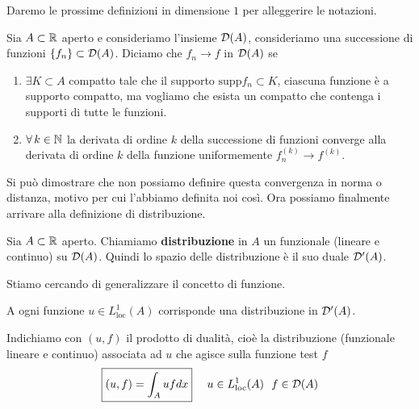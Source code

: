 Daremo le prossime definizioni in dimensione $1$ per alleggerire le notazioni.
\begin{defn}
[Convergenza in $\Dc$]Sia $A\subset \mathbb{R}$ aperto e consideriamo l'insieme $\mathcal{D}(A)$, consideriamo una successione di funzioni $\{f_{n}\} \subset \mathcal{D}(A)$. Diciamo che $f_{n}\rightarrow f$ in $\mathcal{D}(A)$ se
\begin{enumerate}
\item $\exists K\subset A$ compatto tale che il supporto $\mathrm{supp} f_{n} \subset K$, ciascuna funzione è a supporto compatto, ma vogliamo che esista un compatto che contenga i supporti di tutte le funzioni.
\item $\forall k\in \NN$ la derivata di ordine $k$ della successione di funzioni converge alla derivata di ordine $k$ della funzione uniformemente $f^{(k)}_{n}\rightarrow f^{(k)}$.
\end{enumerate}
\end{defn}
Si può dimostrare che non possiamo definire questa convergenza in norma o distanza, motivo per cui l'abbiamo definita noi così. Ora possiamo finalmente arrivare alla definizione di distribuzione.
\begin{defn}
[Distribuzione]
Sia $A\subset \mathbb{R}$ aperto. Chiamiamo \textbf{distribuzione} in $A$ un funzionale (lineare e continuo) su $\mathcal{D}(A)$. Quindi lo spazio delle distribuzione è il suo duale $\mathcal{D}'(A)$.
\end{defn}
Stiamo cercando di generalizzare il concetto di funzione.
\begin{thm}
A ogni funzione $u\in L^{1}_{\mathrm{loc}}(A)$ corrisponde una distribuzione in $\mathcal{D}'(A)$.

Indichiamo con $(u, f)$ il prodotto di dualità, cioè la distribuzione (funzionale lineare e continuo) associata ad $u$ che agisce sulla funzione test $f$
\begin{equation*}
\boxed{(u, f) = \int_{A} ufdx} \ \ \ \ u\in L^{1}_{\mathrm{loc}}(A) \ \ f\in \mathcal{D}(A)
\end{equation*}
\end{thm}
